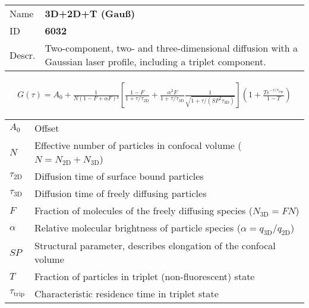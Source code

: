 \noindent \begin{tabular}{lp{}}
Name & \textbf{3D+2D+T (Gauß)} \\ 
ID & \textbf{6032} \\ 
Descr. &  Two-component, two- and three-dimensional diffusion with a Gaussian laser profile, including a triplet component. \\ 
\end{tabular}
\begin{align}
G(\tau) = A_0 + \frac{1}{N (1 - F + \alpha F)²} \left[ \frac{1-F}{1+\tau/\tau_\mathrm{2D}} + \frac{ \alpha^2 F}{ 1+\tau/\tau_\mathrm{3D} } \frac{1}{\sqrt{1+\tau/(\mathit{SP}^2 \tau_\mathrm{3D})}} \right] \left(1 + \frac{T e^{-\tau/\tau_\mathrm{trip}}}{1-T}  \right) 
\end{align} 
\begin{center}
\begin{tabular}{ll}
$A_0$ & Offset \\ 
$N$ & Effective number of particles in confocal volume ($N = N_\mathrm{2D}+N_\mathrm{3D}$) \\ 
$\tau_\mathrm{2D}$ &  Diffusion time of surface bound particles \\ 
$\tau_\mathrm{3D}$ &  Diffusion time of freely diffusing particles \\ 
$F$ & Fraction of molecules of the freely diffusing species ($N_\mathrm{3D} = F N$) \\
$\alpha$ & Relative molecular brightness of particle species ($ \alpha = q_\mathrm{3D}/q_\mathrm{2D}$) \\
$\mathit{SP}$ & Structural parameter, describes elongation of the confocal volume \\
$T$ &  Fraction of particles in triplet (non-fluorescent) state\\ 
$\tau_\mathrm{trip}$ &  Characteristic residence time in triplet state \\ 
\end{tabular}
\end{center}
\vspace{2em}


